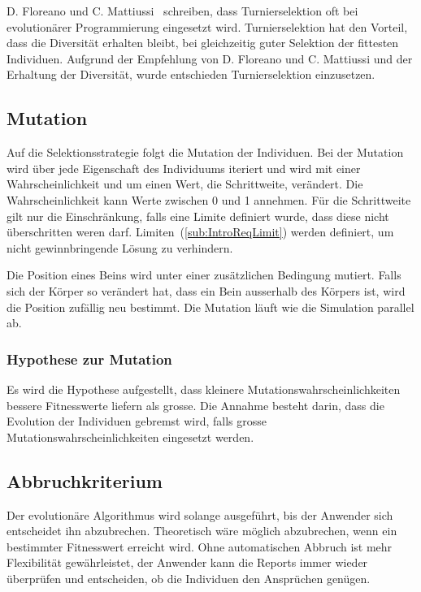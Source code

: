       D. Floreano und C. Mattiussi~\cite[S.33]{book:bioInspired} schreiben,
      dass Turnierselektion oft bei evolutionärer Programmierung eingesetzt wird.
      Turnierselektion hat den Vorteil, dass die Diversität erhalten bleibt,
      bei gleichzeitig guter Selektion der fittesten Individuen.
      Aufgrund der Empfehlung von D. Floreano und C. Mattiussi und der Erhaltung der Diversität,
      wurde entschieden Turnierselektion einzusetzen.

    \subsection{Mutation\label{sec:Mutation}}

      Auf die Selektionsstrategie folgt die Mutation der Individuen.
      Bei der Mutation wird über jede Eigenschaft des Individuums iteriert und
      wird mit einer Wahrscheinlichkeit und um einen Wert, die Schrittweite, verändert.
      Die Wahrscheinlichkeit kann Werte zwischen 0 und 1 annehmen.
      Für die Schrittweite gilt nur die Einschränkung, falls eine Limite definiert wurde,
      dass diese nicht überschritten weren darf.
      Limiten~(\vref{sub:IntroReqLimit}) werden definiert, um nicht gewinnbringende Lösung zu verhindern.

      \medskip

      Die Position eines Beins wird unter einer zusätzlichen Bedingung mutiert. Falls sich der Körper so verändert hat,
      dass ein Bein ausserhalb des Körpers ist, wird die Position zufällig neu bestimmt.
      Die Mutation läuft wie die Simulation parallel ab.

      \subsubsection{Hypothese zur Mutation\label{subsub:hypoMut}}

        Es wird die Hypothese aufgestellt,
        dass kleinere Mutationswahrscheinlichkeiten bessere Fitnesswerte liefern als grosse.
        Die Annahme besteht darin, dass die Evolution der Individuen gebremst wird,
        falls grosse Mutationswahrscheinlichkeiten eingesetzt werden.

    \subsection{Abbruchkriterium}

      Der evolutionäre Algorithmus wird solange ausgeführt, bis der Anwender sich entscheidet ihn abzubrechen.
      Theoretisch wäre möglich abzubrechen, wenn ein bestimmter Fitnesswert erreicht wird.
      Ohne automatischen Abbruch ist mehr Flexibilität gewährleistet,
      der Anwender kann die Reports immer wieder überprüfen und entscheiden,
      ob die Individuen den Ansprüchen genügen.

